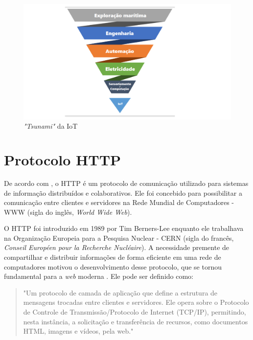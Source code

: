 \begin{figure}[!htb] \centering
  \caption{\textit{"Tsunami"} da IoT} \label{figura:evolucao_iot}
  \begin{varwidth}{\linewidth}
    \includegraphics[width=16cm]{figuras/Datta.png}
  \end{varwidth}
\end{figure}

\section{Protocolo HTTP}
De acordo com \textcite{RFC2616}, o HTTP é um protocolo de comunicação utilizado para sistemas de informação distribuídos e colaborativos. Ele foi concebido para possibilitar a comunicação entre clientes e servidores na Rede Mundial de Computadores - WWW (sigla do inglês, \textit{World Wide Web}).

O HTTP foi introduzido em 1989 por Tim Berners-Lee enquanto ele trabalhava na Organização Europeia para a Pesquisa Nuclear - CERN (sigla do francês, \textit{Conseil Européen pour la Recherche Nucléaire}). A necessidade premente de compartilhar e distribuir informações de forma eficiente em uma rede de computadores motivou o desenvolvimento desse protocolo, que se tornou fundamental para a \textit{web} moderna \parencite{Berners_web}. Ele pode ser definido como:

\begin{quote}
"Um protocolo de camada de aplicação que define a estrutura de mensagens trocadas entre clientes e servidores. Ele opera sobre o Protocolo de Controle de Transmissão/Protocolo de Internet (TCP/IP), permitindo, nesta instância, a solicitação e transferência de recursos, como documentos HTML, imagens e vídeos, pela web." \parencite[{p. 7}]{RFC2616}
\end{quote}

